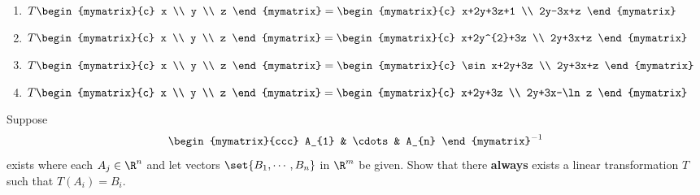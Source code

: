 \begin{enumialphparenastyle}
\begin{ex}
\begin{enumerate}
\item $T\begin{mymatrix}{c}
x \\
y \\
z
\end{mymatrix} =\begin{mymatrix}{c}
x+2y+3z+1 \\
2y-3x+z
\end{mymatrix} $

\item $T\begin{mymatrix}{c}
x \\
y \\
z
\end{mymatrix} =\begin{mymatrix}{c}
x+2y^{2}+3z \\
2y+3x+z
\end{mymatrix} $

\item $T\begin{mymatrix}{c}
x \\
y \\
z
\end{mymatrix} =\begin{mymatrix}{c}
\sin x+2y+3z \\
2y+3x+z
\end{mymatrix} $

\item $T\begin{mymatrix}{c}
x \\
y \\
z
\end{mymatrix} =\begin{mymatrix}{c}
x+2y+3z \\
2y+3x-\ln z
\end{mymatrix} $
\end{enumerate}
\end{ex}


\begin{ex} Suppose 
\begin{equation*}
\begin{mymatrix}{ccc}
A_{1} & \cdots & A_{n}
\end{mymatrix} ^{-1}
\end{equation*}
 exists where each $A_{j}\in \R^{n}$ and let
vectors  $\set{B_{1},\cdots ,B_{n}} $ in $\R^{m}$ be given. 
Show that there \textbf{always }exists a linear
transformation $T$ such that $T(A_{i})=B_{i}$.
\end{ex}



\end{enumialphparenastyle}
